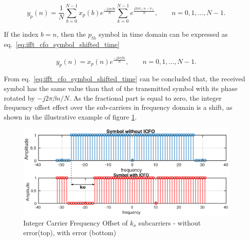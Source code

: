 \begin{equation} 
     y_{p}(n) = \frac{1}{N}\sum\limits_{b=0}^{N-1}x_{p}(b)e^{\frac{-j2{\pi}\beta b}{N}} \sum\limits_{k=0}^{N-1} e^{\frac{j2{\pi}k(n-b)}{N}} , \qquad n = 0,1,...,N-1.
    \label{eq:ifft_cfo_symbol_shifted_2sum}
\end{equation}





If the index $b = n$, then the $p_{th}$ symbol in time domain can be expressed as eq.~\ref{eq:ifft_cfo_symbol_shifted_time}

\begin{equation} 
     y_{p}(n) = x_{p}(n)e^{\frac{-j2{\pi}\beta n}{N}}, \qquad n = 0,1,...,N-1.
    \label{eq:ifft_cfo_symbol_shifted_time}
\end{equation}


From eq.~\ref{eq:ifft_cfo_symbol_shifted_time} can be concluded that, the received symbol has the same value than that of the transmitted symbol with its phase rotated by $-j 2 \pi  \beta n/N$. As the fractional part is equal to zero, the integer frequency offset effect over the sub-carriers in frequency domain is a shift, as shown in the illustrative example of figure \ref{fig:icfo_example}.  
 
 \begin{figure}[hbt]
  \centering
    \includegraphics[width=1\textwidth]
      {./figures/icfo_shift}
  \caption{Integer Carrier Frequency Offset of $k_{o}$ subcarriers - without error(top), with error (bottom)}
  \label{fig:icfo_example}
\end{figure}

